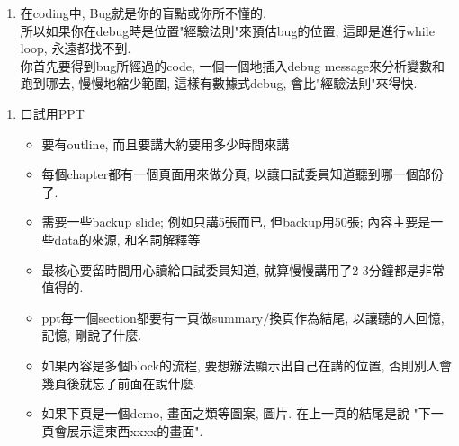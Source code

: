 \begin{enumerate}
  \item
  {
    在coding中, Bug就是你的盲點或你所不懂的. \\
    所以如果你在debug時是位置"經驗法則"來預估bug的位置, 這即是進行while loop, 永遠都找不到.\\
    你首先要得到bug所經過的code, 一個一個地插入debug message來分析變數和跑到哪去, 慢慢地縮少範圍, 這樣有數據式debug, 會比"經驗法則"來得快.
  } %
\end{enumerate}


\begin{enumerate}
  \item
  {
    口試用PPT
    \begin{itemize}
      \item
      {
        要有outline, 而且要講大約要用多少時間來講
      } %

      \item
      {
        每個chapter都有一個頁面用來做分頁, 以讓口試委員知道聽到哪一個部份了.
      } %

      \item
      {
        需要一些backup slide; 例如只講5張而已, 但backup用50張; 內容主要是一些data的來源, 和名詞解釋等
      } %

      \item
      {
        最核心要留時間用心讀給口試委員知道, 就算慢慢講用了2-3分鐘都是非常值得的.
      } %

      \item
      {
        ppt每一個section都要有一頁做summary/換頁作為結尾, 以讓聽的人回憶, 記憶, 剛說了什麼.
      } %

      \item
      {
        如果內容是多個block的流程, 要想辦法顯示出自己在講的位置, 否則別人會幾頁後就忘了前面在說什麼.
      } %

      \item
      {
        如果下頁是一個demo, 畫面之類等圖案, 圖片. 在上一頁的結尾是說 "下一頁會展示這東西xxxx的畫面".
      } %


\end{itemize}}
\end{enumerate}
